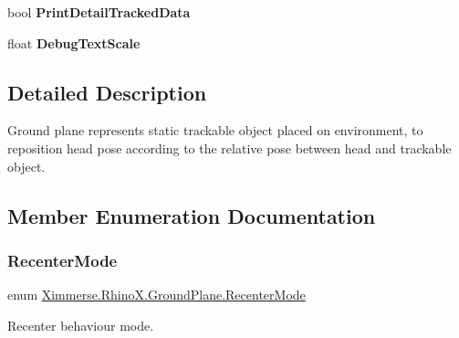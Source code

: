 \begin{DoxyCompactItemize}
\item 
\mbox{\label{class_ximmerse_1_1_rhino_x_1_1_ground_plane_af723d66a4c3fff91ef5033d667ef2436}} 
bool {\bfseries Print\+Detail\+Tracked\+Data}
\item 
\mbox{\label{class_ximmerse_1_1_rhino_x_1_1_ground_plane_af70f6507f27354b7e614d3a581466920}} 
float {\bfseries Debug\+Text\+Scale}
\end{DoxyCompactItemize}


\subsection{Detailed Description}
Ground plane represents static trackable object placed on environment, to reposition head pose according to the relative pose between head and trackable object. 



\subsection{Member Enumeration Documentation}
\mbox{\label{class_ximmerse_1_1_rhino_x_1_1_ground_plane_a8813fd8673b953d9d9eb5e87b16cad14}} 
\subsubsection{\texorpdfstring{Recenter\+Mode}{RecenterMode}}
{\footnotesize\ttfamily enum \mbox{\hyperlink{class_ximmerse_1_1_rhino_x_1_1_ground_plane_a8813fd8673b953d9d9eb5e87b16cad14}{Ximmerse.\+Rhino\+X.\+Ground\+Plane.\+Recenter\+Mode}}\hspace{0.3cm}{\ttfamily [strong]}}



Recenter behaviour mode. 

